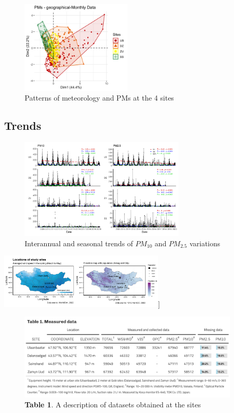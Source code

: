 \documentclass[
  11pt,
]{article}
\begin{document}
\begin{figure}
\centering
\includegraphics[width=2.08333in,height=\textheight,keepaspectratio]{images/figure_7b.png}
\caption{Patterns of meteorology and PMs at the 4 sites}
\end{figure}

\newpage
\subsection{Trends}

\begin{figure}
\centering
\includegraphics[width=3.125in,height=\textheight,keepaspectratio]{images/figure_8.png}
\caption{Interannual and seasonal trends of \(PM_{10}\) and \(PM_{2.5}\)
variations}
\end{figure}

\newpage

\includegraphics[width=3.125in,height=\textheight,keepaspectratio]{images/figure_1.png}{]}

\begin{figure}
\centering
\includegraphics[width=4.16667in,height=\textheight,keepaspectratio]{images/table_1.png}
\caption{\textbf{Table 1}. A description of datasets obtained at the
sites}
\end{figure}
\end{document}
